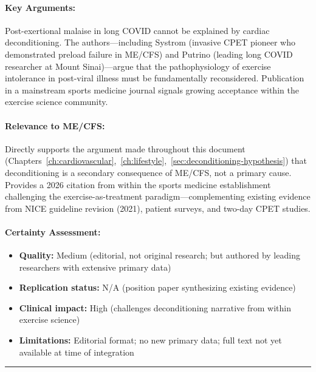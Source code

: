 \paragraph{Key Arguments:}
Post-exertional malaise in long COVID cannot be explained by cardiac deconditioning. The authors---including Systrom (invasive CPET pioneer who demonstrated preload failure in ME/CFS) and Putrino (leading long COVID researcher at Mount Sinai)---argue that the pathophysiology of exercise intolerance in post-viral illness must be fundamentally reconsidered. Publication in a mainstream sports medicine journal signals growing acceptance within the exercise science community.

\paragraph{Relevance to ME/CFS:}
Directly supports the argument made throughout this document (Chapters~\ref{ch:cardiovascular},~\ref{ch:lifestyle},~\ref{sec:deconditioning-hypothesis}) that deconditioning is a secondary consequence of ME/CFS, not a primary cause. Provides a 2026 citation from within the sports medicine establishment challenging the exercise-as-treatment paradigm---complementing existing evidence from NICE guideline revision (2021), patient surveys, and two-day CPET studies.

\paragraph{Certainty Assessment:}
\begin{itemize}
    \item \textbf{Quality:} Medium (editorial, not original research; but authored by leading researchers with extensive primary data)
    \item \textbf{Replication status:} N/A (position paper synthesizing existing evidence)
    \item \textbf{Clinical impact:} High (challenges deconditioning narrative from within exercise science)
    \item \textbf{Limitations:} Editorial format; no new primary data; full text not yet available at time of integration
\end{itemize}

\vspace{1cm}
\begin{center}
\rule{0.5\textwidth}{0.4pt}
\end{center}
\vspace{0.5cm}

